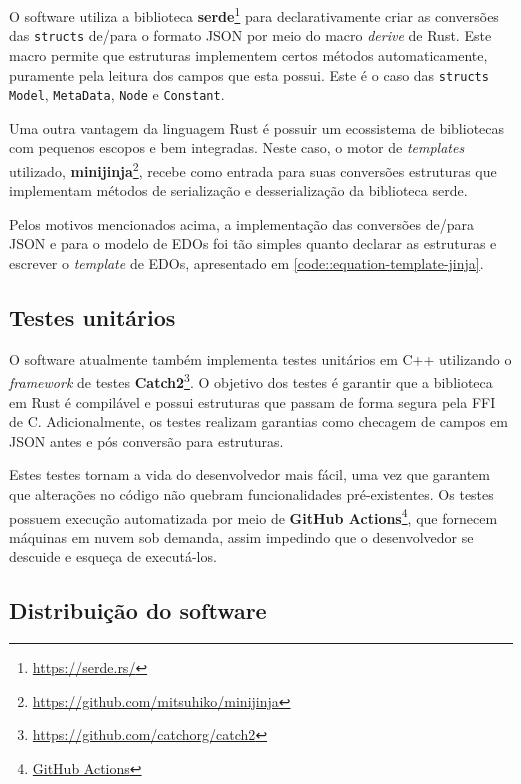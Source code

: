 \documentclass[
	12pt,				%
	openright,			%
	oneside,			%
	a4paper,			%
	main=brazil,
	english,			%
	]{ufsj-abntex2}
\begin{document}
O software utiliza a biblioteca \textbf{serde}\footnote{\href{https://serde.rs/}{https://serde.rs/}} para declarativamente criar as conversões das \texttt{structs} de/para o formato JSON por meio do macro \textit{derive} de Rust. Este macro permite que estruturas implementem certos métodos automaticamente, puramente pela leitura dos campos que esta possui. Este é o caso das \texttt{structs} \texttt{Model}, \texttt{MetaData}, \texttt{Node} e \texttt{Constant}.

Uma outra vantagem da linguagem Rust é possuir um ecossistema de bibliotecas com pequenos escopos e bem integradas. Neste caso, o motor de \textit{templates} utilizado, \textbf{minijinja}\footnote{\href{https://github.com/mitsuhiko/minijinja}{https://github.com/mitsuhiko/minijinja}}, recebe como entrada para suas conversões estruturas que implementam métodos de serialização e desserialização da biblioteca serde.

Pelos motivos mencionados acima, a implementação das conversões de/para JSON e para o modelo de EDOs foi tão simples quanto declarar as estruturas e escrever o \textit{template} de EDOs, apresentado em \ref{code::equation-template-jinja}.

\subsection{Testes unitários}

O software atualmente também implementa testes unitários em C++ utilizando o \textit{framework} de testes \textbf{Catch2}\footnote{\href{https://github.com/catchorg/catch2}{https://github.com/catchorg/catch2}}. O objetivo dos testes é garantir que a biblioteca em Rust é compilável e possui estruturas que passam de forma segura pela FFI de C. Adicionalmente, os testes realizam garantias como checagem de campos em JSON antes e pós conversão para estruturas.

Estes testes tornam a vida do desenvolvedor mais fácil, uma vez que garantem que alterações no código não quebram funcionalidades pré-existentes. Os testes possuem execução automatizada por meio de \textbf{GitHub Actions}\footnote{\href{https://github.com/features/actions}{GitHub Actions}}, que fornecem máquinas em nuvem sob demanda, assim impedindo que o desenvolvedor se descuide e esqueça de executá-los.

\subsection{Distribuição do software}
\end{document}
